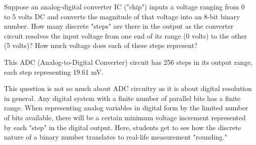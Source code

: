 

Suppose an analog-digital converter IC ("chip") inputs a voltage ranging from 0 to 5 volts DC and converts the magnitude of that voltage into an 8-bit binary number.  How many discrete "steps" are there in the output as the converter circuit resolves the input voltage from one end of its range (0 volts) to the other (5 volts)?  How much voltage does each of these steps represent?







This ADC (Analog-to-Digital Converter) circuit has 256 steps in its output range, each step representing 19.61 mV.







This question is not so much about ADC circuitry as it is about digital resolution in general.  Any digital system with a finite number of parallel bits has a finite range.  When representing analog variables in digital form by the limited number of bits available, there will be a certain minimum voltage increment represented by each "step" in the digital output.  Here, students get to see how the discrete nature of a binary number translates to real-life measurement "rounding."




